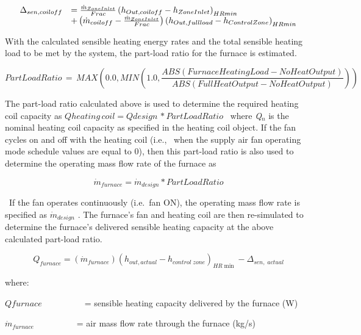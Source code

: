 \begin{equation}
  \begin{array}{rl}
    \Delta_{sen,coil off} &= \frac{\dot{m}_{ZoneInlet}}{Frac} \PB{h_{Out,coil off} - h_{ZoneInlet}}_{HRmin} \\
                           &+ \PB{\dot{m}_{coil off} - \frac{\dot{m}_{ZoneInlet}}{Frac}} \PB{h_{Out,full load} - h_{ControlZone}}_{HRmin}
  \end{array}
\end{equation}

With the calculated sensible heating energy rates and the total sensible heating load to be met by the system, the part-load ratio for the furnace is estimated.

\begin{equation}
PartLoadRatio\, = \,MAX\left( {0.0,MIN\left( {1.0,\frac{{ABS\left( {FurnaceHeatingLoad - NoHeatOutput} \right)}}{{ABS(FullHeatOutput - NoHeatOutput)}}} \right)} \right)
\end{equation}

The part-load ratio calculated above is used to determine the required heating coil capacity as \(Qheating\,coil = Qdesign\,*PartLoadRatio\) ~where \emph{Q\(_{n}\)} is the nominal heating coil capacity as specified in the heating coil object. If the fan cycles on and off with the heating coil (i.e.,~ when the supply air fan operating mode schedule values are equal to 0), then this part-load ratio is also used to determine the operating mass flow rate of the furnace as

\begin{equation}
{\dot m_{furnace}} = {\dot m_{design}}*PartLoadRatio
\end{equation}

~If the fan operates continuously (i.e.~fan ON), the operating mass flow rate is specified as \({\dot m_{design}}\) . The furnace's fan and heating coil are then re-simulated to determine the furnace's delivered sensible heating capacity at the above calculated part-load ratio.

\begin{equation}
{Q_{furnace}} = \left( {{{\dot m}_{furnace}}} \right){\left( {{h_{out,actual}} - {h_{control\;zone}}} \right)_{HR\min }} - {\Delta_{sen,\;actual}}
\end{equation}

where:

\(Qfurnace\) ~~~~~~ ~~ = sensible heating capacity delivered by the furnace (W)

\({\dot m_{furnace}}\) ~~~~~ ~~~ = air mass flow rate through the furnace (kg/s)


